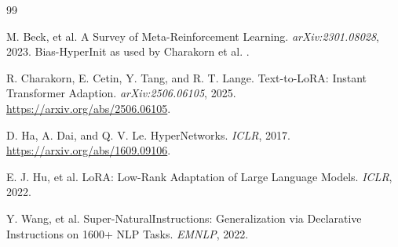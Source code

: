 \documentclass{article}
\begin{document}
{\small

\begin{thebibliography}{99}

M. Beck, et al.
\newblock A Survey of Meta-Reinforcement Learning.
\newblock \emph{arXiv:2301.08028}, 2023.
\newblock Bias-HyperInit as used by Charakorn et al. \cite{charakorn2025texttolora}.

R. Charakorn, E. Cetin, Y. Tang, and R. T. Lange.
\newblock Text-to-LoRA: Instant Transformer Adaption.
\newblock \emph{arXiv:2506.06105}, 2025.
\newblock \url{https://arxiv.org/abs/2506.06105}.

D. Ha, A. Dai, and Q. V. Le.
\newblock HyperNetworks.
\newblock \emph{ICLR}, 2017.
\newblock \url{https://arxiv.org/abs/1609.09106}.

E. J. Hu, et al.
\newblock LoRA: Low-Rank Adaptation of Large Language Models.
\newblock \emph{ICLR}, 2022.

Y. Wang, et al.
\newblock Super-NaturalInstructions: Generalization via Declarative Instructions on 1600+ NLP Tasks.
\newblock \emph{EMNLP}, 2022.

\end{thebibliography}
}
\end{document}
